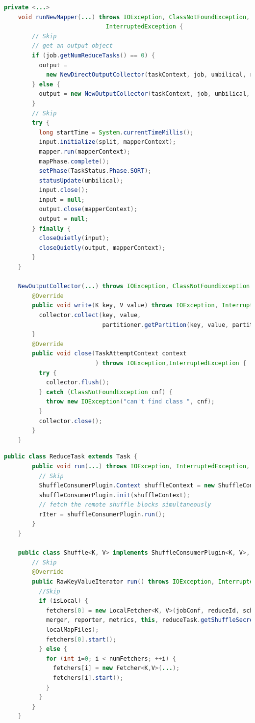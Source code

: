 \begin{lstlisting}[language={Java}, caption={Hadoop MapReduce中Map阶段的shuffle写代码片段}, label={code:hadoopmap}]
    private <...>
    void runNewMapper(...) throws IOException, ClassNotFoundException,
                             InterruptedException {
        // Skip
        // get an output object
        if (job.getNumReduceTasks() == 0) {
          output = 
            new NewDirectOutputCollector(taskContext, job, umbilical, reporter);
        } else {
          output = new NewOutputCollector(taskContext, job, umbilical, reporter);
        }
        // Skip    
        try {
          long startTime = System.currentTimeMillis();
          input.initialize(split, mapperContext);
          mapper.run(mapperContext);
          mapPhase.complete();
          setPhase(TaskStatus.Phase.SORT);
          statusUpdate(umbilical);
          input.close();
          input = null;
          output.close(mapperContext);
          output = null;
        } finally {
          closeQuietly(input);
          closeQuietly(output, mapperContext);
        }
    }

    NewOutputCollector(...) throws IOException, ClassNotFoundException {
        @Override
        public void write(K key, V value) throws IOException, InterruptedException {
          collector.collect(key, value,
                            partitioner.getPartition(key, value, partitions));
        }
        @Override
        public void close(TaskAttemptContext context
                          ) throws IOException,InterruptedException {
          try {
            collector.flush();
          } catch (ClassNotFoundException cnf) {
            throw new IOException("can't find class ", cnf);
          }
          collector.close();
        }
    }
\end{lstlisting}

\begin{lstlisting}[language={Java}, caption={Hadoop MapReduce中Reduce阶段的shuffle读代码片段}, label={code:hadoopreduce}]
    public class ReduceTask extends Task {
        public void run(...) throws IOException, InterruptedException, ClassNotFoundException {
          // Skip
          ShuffleConsumerPlugin.Context shuffleContext = new ShuffleConsumerPlugin.Context(...);
          shuffleConsumerPlugin.init(shuffleContext);
          // fetch the remote shuffle blocks simultaneously
          rIter = shuffleConsumerPlugin.run();
        }
    }

    public class Shuffle<K, V> implements ShuffleConsumerPlugin<K, V>, ExceptionReporter {
        // Skip
        @Override
        public RawKeyValueIterator run() throws IOException, InterruptedException {
          //Skip
          if (isLocal) {
            fetchers[0] = new LocalFetcher<K, V>(jobConf, reduceId, scheduler,
            merger, reporter, metrics, this, reduceTask.getShuffleSecret(),
            localMapFiles);
            fetchers[0].start();
          } else {
            for (int i=0; i < numFetchers; ++i) {
              fetchers[i] = new Fetcher<K,V>(...);
              fetchers[i].start();
            }
          }
        }
    }
\end{lstlisting}

